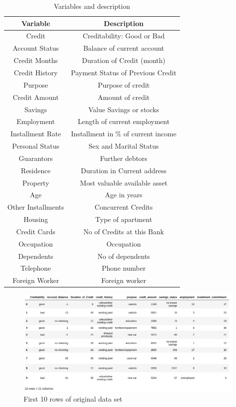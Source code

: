 \documentclass[sigconf]{acmart}
\begin{document}
\begin{table}
  \caption{Variables and description
  \cite{psu-site}}
  \label{tab:table1}
  \begin{tabular}{cc}
    \toprule
     Variable& Description\\
    \midrule
    Credit& Creditability: Good or Bad\\
    Account Status& Balance of current account\\
    Credit Months& Duration of Credit (month)\\
    Credit History& Payment Status of Previous Credit\\
    Purpose& Purpose of credit\\
    Credit Amount& Amount of credit\\
    Savings& Value Savings or stocks\\
    Employment& Length of current employment\\
    Installment Rate& Installment in \% of current income\\
    Personal Status& Sex and Marital Status\\
    Guarantors& Further debtors\\
    Residence& Duration in Current address\\
    Property& Most valuable available asset\\
    Age& Age in years\\
    Other Installments& Concurrent Credits\\
    Housing& Type of apartment\\
    Credit Cards& No of Credits at this Bank\\
    Occupation& Occupation\\
    Dependents& No of dependents\\
    Telephone& Phone number\\
    Foreign Worker& Foreign worker\\
    \bottomrule
  \end{tabular}
\end{table}


\begin{figure}[htb]
  \centering
  \includegraphics[width=1.0\columnwidth]{images/Figure5.png}
  \caption{First 10 rows of original data set
  \cite{github}}
  \label{fig:Figure5} 
\end{figure}
\end{document}
